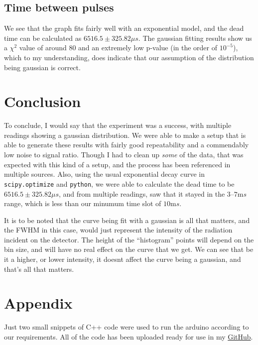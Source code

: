 \documentclass{double}
\begin{document}
\begin{multicols*}{2}
\subsection{Time between pulses}
\begin{figure}[H]
	\centering
	\resizebox{0.8\columnwidth}{!}{%
		
	}
\end{figure}
We see that the graph fits fairly well with an exponential model, and the dead time can be calculated as $6516.5\pm 325.82 \si{\mu s}$. The gaussian fitting results show us a $\chi^2$ value of around $80$ and an extremely low p-value (in the order of $10^{-5}$), which to my understanding, does indicate that our assumption of the distribution being gaussian is correct.

\section{Conclusion}
To conclude, I would say that the experiment was a success, with multiple readings showing a gaussian distribution. We were able to make a setup that is able to generate these results with fairly good repeatability and a commendably low noise to signal ratio. Though I had to clean up \emph{some} of the data, that was expected with this kind of a setup, and the process has been referenced in multiple sources. Also, using the usual exponential decay curve in \texttt{scipy.optimize} and \texttt{python}, we were able to calculate the dead time to be $6516.5\pm 325.82 \si{\mu s}$, and from multiple readings, saw that it stayed in the $3\text{--}7\si{\milli s}$ range, which is less than our minumum time slot of $10\si{\milli s}$.

It is to be noted that the curve being fit with a gaussian is all that matters, and the FWHM in this case, would just represent the intensity of the radiation incident on the detector. The height of the ``histogram'' points will depend on the bin size, and will have no real effect on the curve that we get. We can see that be it a higher, or lower intensity, it doesnt affect the curve being a gaussian, and that's all that matters.

\section{Appendix}
\label{appendix}
Just two small snippets of C++ code were used to run the arduino according to our requirements. All of the code has been uploaded ready for use in my \href{https://github.com/surelynottrue/single-photon}{GitHub}. 


\end{multicols*}
\end{document}
